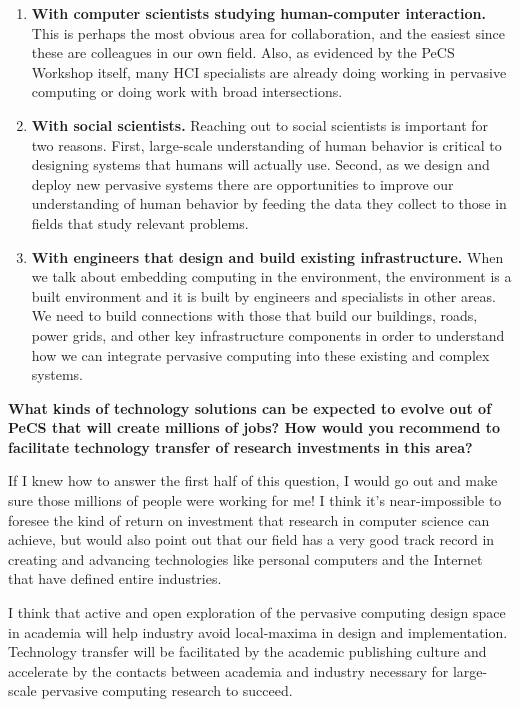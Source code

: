 \begin{flushenumbf}
\begin{enumerate}

\item \textbf{With computer scientists studying human-computer interaction.}
This is perhaps the most obvious area for collaboration, and the easiest
since these are colleagues in our own field. Also, as evidenced by the PeCS
Workshop itself, many HCI specialists are already doing working in pervasive
computing or doing work with broad intersections.

\item \textbf{With social scientists.} Reaching out to social scientists is
important for two reasons. First, large-scale understanding of human behavior
is critical to designing systems that humans will actually use. Second, as we
design and deploy new pervasive systems there are opportunities to improve
our understanding of human behavior by feeding the data they collect to
those in fields that study relevant problems.

\item \textbf{With engineers that design and build existing infrastructure.}
When we talk about embedding computing in the environment, the environment is
a built environment and it is built by engineers and specialists in other
areas. We need to build connections with those that build our buildings,
roads, power grids, and other key infrastructure components in order to
understand how we can integrate pervasive computing into these existing and
complex systems.

\end{enumerate}

\item \textbf{What kinds of technology solutions can be expected to evolve
out of PeCS that will create millions of jobs? How would you recommend to
facilitate technology transfer of research investments in this area?}

If I knew how to answer the first half of this question, I would go out and
make sure those millions of people were working for me! I think it's
near-impossible to foresee the kind of return on investment that research in
computer science can achieve, but would also point out that our field has a
very good track record in creating and advancing technologies like personal
computers and the Internet that have defined entire industries.

I think that active and open exploration of the pervasive computing design
space in academia will help industry avoid local-maxima in design and
implementation. Technology transfer will be facilitated by the academic
publishing culture and accelerate by the contacts between academia and
industry necessary for large-scale pervasive computing research to succeed.


\end{flushenumbf}
